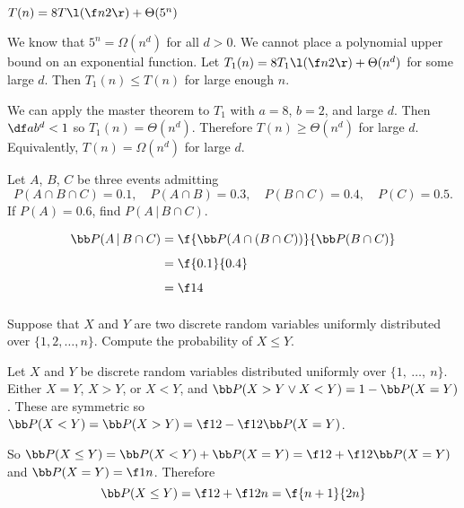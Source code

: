 \documentclass[a4paper]{article}
\begin{document}
\begin{questionbody}
$T(n) = 8T\l(\f n2\r) + \Theta(5^n)$
\end{questionbody}

We know that $5^n = \Omega(n^d)$ for all $d > 0$. We cannot place a polynomial upper bound on an exponential function. Let $T_1(n) = 8T_1\l(\f n2\r) + \Theta(n^d)$ for some large $d$. Then $T_1(n) \le T(n)$ for large enough $n$.

We can apply the master theorem to $T_1$ with $a=8$, $b=2$, and large $d$. Then $\df a{b^d} < 1$ so $T_1(n) = \Theta(n^d)$. Therefore $T(n) \ge \Theta(n^d)$ for large $d$. Equivalently, $T(n) = \Omega(n^d)$ for large $d$.


\begin{questionbody}
Let $A$, $B$, $C$ be three events admitting \[
P(A \cap B \cap C) = 0.1, \quad P(A \cap B) = 0.3, \quad P(B \cap C) = 0.4, \quad P(C) = 0.5.
\]
If $P(A) = 0.6$, find $P(A \,|\, B \cap C)$.
\end{questionbody}

\begin{align*}
\bb P(A \,|\, B \cap C) &= \f{\bb P(A \cap (B \cap C))}{\bb P(B \cap C)}\\[1ex]
&= \f{0.1}{0.4}\\[1ex]
&= \f14\\[1ex]
\end{align*}


\begin{questionbody}
Suppose that $X$ and $Y$ are two discrete random variables uniformly distributed over $\{1, 2, \dotsc, n\}$. Compute the probability of $X \le Y$.
\end{questionbody}

Let $X$ and $Y$ be discrete random variables distributed uniformly over $\{1,\ \ldots,\ n\}$. Either $X = Y$, $X > Y$, or $X < Y$, and $\bb P(X > Y \lor X < Y) = 1 - \bb P(X = Y)$. These are symmetric so $\bb P(X < Y) = \bb P(X > Y) = \f12 - \f12 \bb P(X = Y)$.

So $\bb P(X \le Y) = \bb P(X < Y) + \bb P(X = Y) = \f12  + \f12 \bb P(X = Y)$ and $\bb P(X = Y) = \f1n$. Therefore \[ \bb P(X \le Y) = \f12 + \f1{2n} = \f{n + 1}{2n} \]

%


\end{document}
